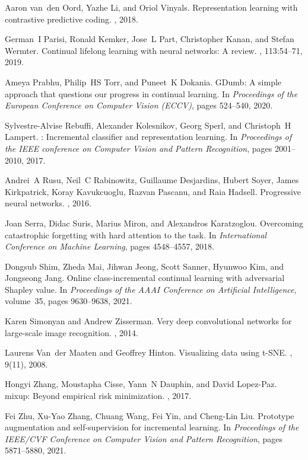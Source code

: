 \documentclass[10pt,twocolumn,letterpaper]{article}
\begin{document}
{\begin{thebibliography}{10}
Aaron van~den Oord, Yazhe Li, and Oriol Vinyals.
\newblock Representation learning with contrastive predictive coding.
, 2018.

German~I Parisi, Ronald Kemker, Jose~L Part, Christopher Kanan, and Stefan
  Wermter.
\newblock Continual lifelong learning with neural networks: A review.
, 113:54--71, 2019.

Ameya Prabhu, Philip~HS Torr, and Puneet~K Dokania.
\newblock GDumb: A simple approach that questions our progress in continual
  learning.
\newblock In {\em Proceedings of the European Conference on Computer Vision
  (ECCV)}, pages 524--540, 2020.

Sylvestre-Alvise Rebuffi, Alexander Kolesnikov, Georg Sperl, and Christoph~H
  Lampert.
: Incremental classifier and representation learning.
\newblock In {\em Proceedings of the IEEE conference on Computer Vision and
  Pattern Recognition}, pages 2001--2010, 2017.

Andrei~A Rusu, Neil~C Rabinowitz, Guillaume Desjardins, Hubert Soyer, James
  Kirkpatrick, Koray Kavukcuoglu, Razvan Pascanu, and Raia Hadsell.
\newblock Progressive neural networks.
, 2016.

Joan Serra, Didac Suris, Marius Miron, and Alexandros Karatzoglou.
\newblock Overcoming catastrophic forgetting with hard attention to the task.
\newblock In {\em International Conference on Machine Learning}, pages
  4548--4557, 2018.

Dongsub Shim, Zheda Mai, Jihwan Jeong, Scott Sanner, Hyunwoo Kim, and Jongseong
  Jang.
\newblock Online class-incremental continual learning with adversarial Shapley
  value.
\newblock In {\em Proceedings of the AAAI Conference on Artificial
  Intelligence}, volume~35, pages 9630--9638, 2021.

Karen Simonyan and Andrew Zisserman.
\newblock Very deep convolutional networks for large-scale image recognition.
, 2014.

Laurens Van~der Maaten and Geoffrey Hinton.
\newblock Visualizing data using {t-SNE}.
, 9(11), 2008.

Hongyi Zhang, Moustapha Cisse, Yann~N Dauphin, and David Lopez-Paz.
\newblock mixup: Beyond empirical risk minimization.
, 2017.

Fei Zhu, Xu-Yao Zhang, Chuang Wang, Fei Yin, and Cheng-Lin Liu.
\newblock Prototype augmentation and self-supervision for incremental learning.
\newblock In {\em Proceedings of the IEEE/CVF Conference on Computer Vision and
  Pattern Recognition}, pages 5871--5880, 2021.

\end{thebibliography}

}

\clearpage


\end{document}
